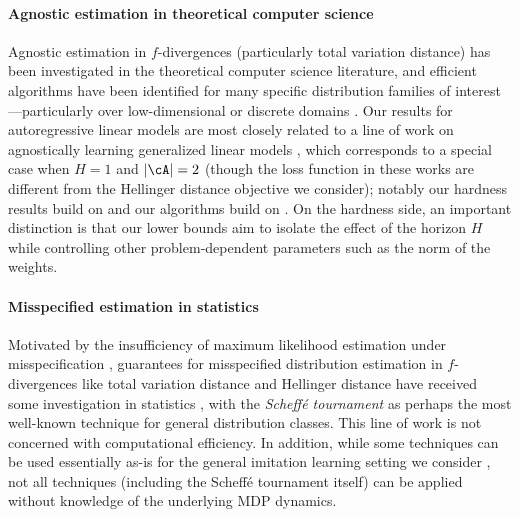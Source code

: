   \paragraph{Agnostic estimation in theoretical computer science}
  Agnostic estimation in $f$-divergences (particularly total
  variation distance) has been investigated in the theoretical
  computer science literature, and efficient algorithms have been
  identified for many specific distribution families of
  interest---particularly over low-dimensional or discrete domains
  \citep{acharya2015fast,diakonikolas2016learning,acharya2017sample,bousquet2019optimal}. Our
  results for autoregressive linear models are most closely related to a line of work on agnostically
  learning generalized linear models
  \citep{shalev2011learning,diakonikolas2022hardness,diakonikolas2022learning,gollakota2024agnostically},
  which corresponds to a special case when $H=1$ and $\abs{\cA}=2$
  (though the loss function in these works are different from the
  Hellinger distance objective we consider); notably our hardness results build on
  \citet{diakonikolas2022hardness} and our algorithms build on
  \citet{shalev2011learning}. On the hardness side, an important distinction is that
  our lower bounds aim to isolate the effect of the horizon $H$
  while controlling other problem-dependent parameters such as the
  norm of the weights.

  \paragraph{Misspecified estimation in statistics}
  Motivated by the insufficiency of maximum likelihood estimation under
  misspecification \citep{le1990maximum,birge2006model}, guarantees
  for misspecified distribution estimation in $f$-divergences
  like total variation distance and Hellinger distance have received
  some investigation in statistics \citep{devroye2001combinatorial,baraud2017new,baraud2018rho}, with the \emph{Scheff\'e
    tournament} \citep{devroye2001combinatorial} as perhaps the most
  well-known technique for general distribution classes. This line of
  work is not concerned with computational efficiency. In addition,
  while some techniques can be used essentially as-is for the general imitation
  learning setting we consider \citep{baraud2018rho}, not all
  techniques (including the Scheff\'e
    tournament itself) can be applied without knowledge of the
  underlying MDP dynamics.\loose

  
  
